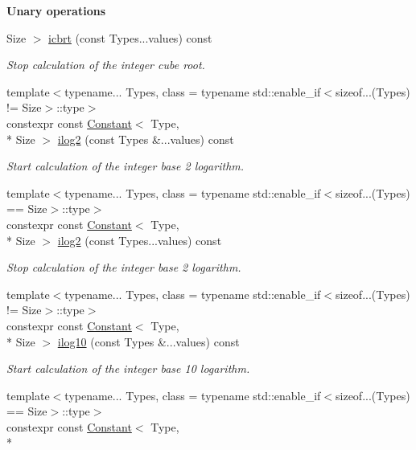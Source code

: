 \begin{Indent}{\bf Unary operations}
\begin{DoxyCompactItemize}
Size $>$ \hyperlink{exceptionmagrathea_1_1Constant_a5d1484d9b7067a6847da625d9f2e1754}{icbrt} (const Types...\-values) const 
\begin{DoxyCompactList}\small\item\em Stop calculation of the integer cube root. \end{DoxyCompactList}\item 
{\footnotesize template$<$typename... Types, class  = typename std\-::enable\-\_\-if$<$sizeof...(\-Types) != Size$>$\-::type$>$ }\\constexpr const \hyperlink{exceptionmagrathea_1_1Constant}{Constant}$<$ Type, \\*
Size $>$ \hyperlink{exceptionmagrathea_1_1Constant_a8506e353dd9cba341da6f9bab7bac51a}{ilog2} (const Types \&...values) const 
\begin{DoxyCompactList}\small\item\em Start calculation of the integer base 2 logarithm. \end{DoxyCompactList}\item 
{\footnotesize template$<$typename... Types, class  = typename std\-::enable\-\_\-if$<$sizeof...(\-Types) == Size$>$\-::type$>$ }\\constexpr const \hyperlink{exceptionmagrathea_1_1Constant}{Constant}$<$ Type, \\*
Size $>$ \hyperlink{exceptionmagrathea_1_1Constant_a62346c844500d6ec3c1315b7c7d48273}{ilog2} (const Types...\-values) const 
\begin{DoxyCompactList}\small\item\em Stop calculation of the integer base 2 logarithm. \end{DoxyCompactList}\item 
{\footnotesize template$<$typename... Types, class  = typename std\-::enable\-\_\-if$<$sizeof...(\-Types) != Size$>$\-::type$>$ }\\constexpr const \hyperlink{exceptionmagrathea_1_1Constant}{Constant}$<$ Type, \\*
Size $>$ \hyperlink{exceptionmagrathea_1_1Constant_a00b3a4bbf478172911401fcfccaa7f3c}{ilog10} (const Types \&...values) const 
\begin{DoxyCompactList}\small\item\em Start calculation of the integer base 10 logarithm. \end{DoxyCompactList}\item 
{\footnotesize template$<$typename... Types, class  = typename std\-::enable\-\_\-if$<$sizeof...(\-Types) == Size$>$\-::type$>$ }\\constexpr const \hyperlink{exceptionmagrathea_1_1Constant}{Constant}$<$ Type, \\*

\end{DoxyCompactItemize}
\end{Indent}
